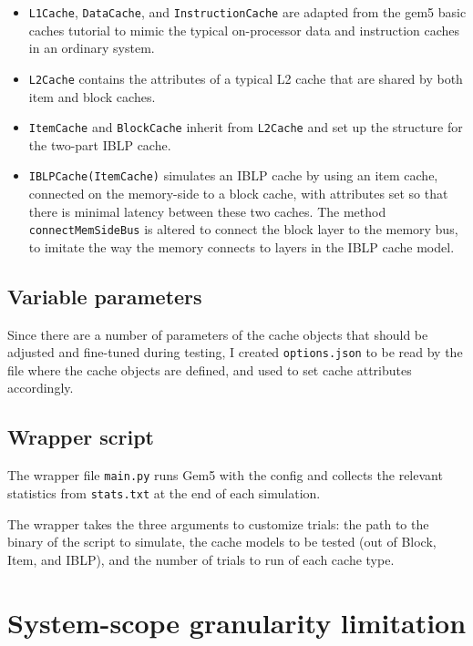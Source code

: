 \documentclass[12pt,twoside]{reedthesis}
\begin{document}
	\begin{itemize}
		\item \verb`L1Cache`, \verb`DataCache`, and \verb`InstructionCache` are adapted from the gem5 basic caches tutorial to mimic the typical on-processor data and instruction caches in an ordinary system.
	
		\item \verb`L2Cache` contains the attributes of a typical L2 cache that are shared by both item and block caches.
	
		\item \verb`ItemCache` and \verb`BlockCache` inherit from \verb`L2Cache` and set up the structure for the two-part IBLP cache.
	
		\item \verb`IBLPCache(ItemCache)` simulates an IBLP cache by using an item cache, connected on the memory-side to a block cache, with attributes set so that there is minimal latency between these two caches. The method \verb`connectMemSideBus` is altered to connect the block layer to the memory bus, to imitate the way the memory connects to layers in the IBLP cache model.
	\end{itemize}

	\subsection*{Variable parameters}

	Since there are a number of parameters of the cache objects that should be adjusted and fine-tuned during testing, I created \verb`options.json` to be read by the file where the cache objects are defined, and used to set cache attributes accordingly.

	\subsection*{Wrapper script}

	The wrapper file \verb`main.py` runs Gem5 with the config and collects the relevant statistics from \verb`stats.txt` at the end of each simulation.

	The wrapper takes the three arguments to customize trials: the path to the binary of the script to simulate, the cache models to be tested (out of Block, Item, and IBLP), and the number of trials to run of each cache type.

\section{System-scope granularity limitation}
\end{document}
